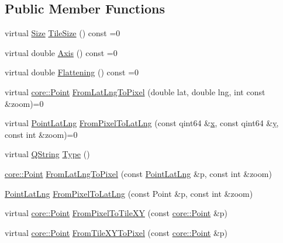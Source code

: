 \subsection*{\-Public \-Member \-Functions}
\begin{DoxyCompactItemize}
\item 
virtual \hyperlink{structcore_1_1_size}{\-Size} \hyperlink{group___o_p_map_widget_ga745313ff69d0f869f456ccbc312cc2bf}{\-Tile\-Size} () const =0
\item 
virtual double \hyperlink{group___o_p_map_widget_ga72d36ba021583a6dec5f549c6137494a}{\-Axis} () const =0
\item 
virtual double \hyperlink{group___o_p_map_widget_ga253e85d9958729b994bf7b9e075297de}{\-Flattening} () const =0
\item 
virtual \hyperlink{structcore_1_1_point}{core\-::\-Point} \hyperlink{group___o_p_map_widget_gacadfc01954e3e37c801106981b297b45}{\-From\-Lat\-Lng\-To\-Pixel} (double lat, double lng, int const \&zoom)=0
\item 
virtual \hyperlink{structinternals_1_1_point_lat_lng}{\-Point\-Lat\-Lng} \hyperlink{group___o_p_map_widget_ga235a8ad2ed5da22f78e0c5d447f8d34c}{\-From\-Pixel\-To\-Lat\-Lng} (const qint64 \&\hyperlink{_o_p_plots_8m_a9336ebf25087d91c818ee6e9ec29f8c1}{x}, const qint64 \&\hyperlink{_o_p_plots_8m_a2fb1c5cf58867b5bbc9a1b145a86f3a0}{y}, const int \&zoom)=0
\item 
virtual \hyperlink{group___u_a_v_objects_plugin_gab9d252f49c333c94a72f97ce3105a32d}{\-Q\-String} \hyperlink{group___o_p_map_widget_gae371ba9189e5318e016af0df9cf0123f}{\-Type} ()
\item 
\hyperlink{structcore_1_1_point}{core\-::\-Point} \hyperlink{group___o_p_map_widget_ga18aa4617ab63019451badac8567c85d8}{\-From\-Lat\-Lng\-To\-Pixel} (const \hyperlink{structinternals_1_1_point_lat_lng}{\-Point\-Lat\-Lng} \&p, const int \&zoom)
\item 
\hyperlink{structinternals_1_1_point_lat_lng}{\-Point\-Lat\-Lng} \hyperlink{group___o_p_map_widget_ga44df6b58603a8cdba19f7bf899cc57bc}{\-From\-Pixel\-To\-Lat\-Lng} (const \-Point \&p, const int \&zoom)
\item 
virtual \hyperlink{structcore_1_1_point}{core\-::\-Point} \hyperlink{group___o_p_map_widget_ga44846fe14a2b915a79c730b0b6513579}{\-From\-Pixel\-To\-Tile\-X\-Y} (const \hyperlink{structcore_1_1_point}{core\-::\-Point} \&p)
\item 
virtual \hyperlink{structcore_1_1_point}{core\-::\-Point} \hyperlink{group___o_p_map_widget_ga6eb6b9db59d0e4e58f4e70c4d4d2887a}{\-From\-Tile\-X\-Y\-To\-Pixel} (const \hyperlink{structcore_1_1_point}{core\-::\-Point} \&p)

\end{DoxyCompactItemize}
